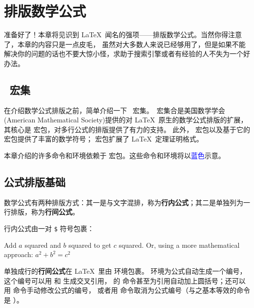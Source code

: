 \chapter{排版数学公式}

\begin{intro}
准备好了！本章将见识到 \LaTeX\ 闻名的强项——排版数学公式。当然你得注意了，本章的内容只是一点皮毛，
虽然对大多数人来说已经够用了，但是如果不能解决你的问题的话也不要大惊小怪，求助于搜索引擎或者有经验的人不失为一个好办法。
\end{intro}
\DeclareRobustCommand*\amscmd[1]{\textcolor{blue}{\cmd{#1}}}
\DeclareRobustCommand*\amsenv[1]{\textcolor{blue}{\env{#1}}}

\section{\AmS\ 宏集}\label{sec:ams-bundle}

在介绍数学公式排版之前，简单介绍一下 \AmS\ 宏集。\AmS\ 宏集合是美国数学学会(American Mathematical Society)提供的对
\LaTeX\ 原生的数学公式排版的扩展，其核心是  宏包，对多行公式的排版提供了有力的支持。
此外， 宏包以及基于它的  宏包提供了丰富的数学符号； 宏包扩展了 \LaTeX\ 定理证明格式。

本章介绍的许多命令和环境依赖于  宏包。这些命令和环境将以\textcolor{blue}{蓝色}示意。

\section{公式排版基础}\label{sec:math-basics}

数学公式有两种排版方式：其一是与文字混排，称为\textbf{行内公式}；其二是单独列为一行排版，称为\textbf{行间公式}。

行内公式由一对 \texttt\$ 符号包裹：
\begin{example}
Add $a$ squared and $b$ squared
to get $c$ squared. Or, using
a more mathematical approach:
$a^2 + b^2 = c^2$
\end{example}

单独成行的\textbf{行间公式}在 \LaTeX\ 里由  环境包裹。
 环境为公式自动生成一个编号，这个编号可以用  和  生成交叉引用，
 的 \amscmd{eqref} 命令甚至为引用自动加上圆括号；还可以用 \amscmd{tag} 命令手动修改公式的编号，
或者用 \amscmd{notag} 命令取消为公式编号（与之基本等效的命令是 ）。

